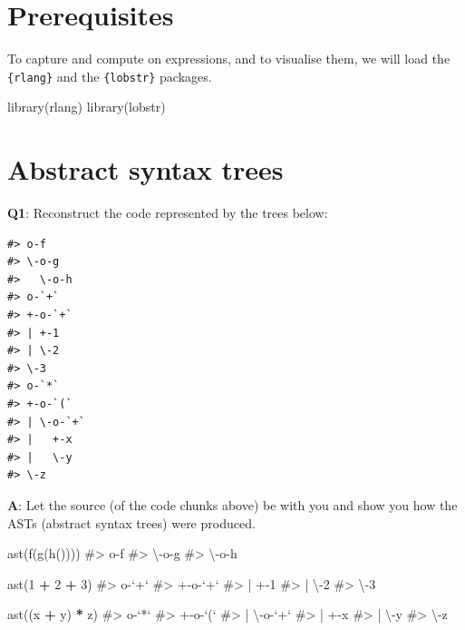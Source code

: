 \documentclass[
]{krantz}
\makeatletter
\newenvironment{Shaded}{\begin{snugshade}}{\end{snugshade}}
\newcommand{\CommentTok}[1]{\textcolor[rgb]{0.56,0.35,0.01}{\textit{#1}}}
\newcommand{\DecValTok}[1]{\textcolor[rgb]{0.00,0.00,0.81}{#1}}
\newcommand{\KeywordTok}[1]{\textcolor[rgb]{0.13,0.29,0.53}{\textbf{#1}}}
\newcommand{\NormalTok}[1]{#1}
\newcommand{\OperatorTok}[1]{\textcolor[rgb]{0.81,0.36,0.00}{\textbf{#1}}}
\newcommand{\StringTok}[1]{\textcolor[rgb]{0.31,0.60,0.02}{#1}}
\newenvironment{kframe}{%
\medskip{}
\setlength{\fboxsep}{.8em}
 \def\at@end@of@kframe{}%
 \ifinner\ifhmode%
  \def\at@end@of@kframe{\end{minipage}}%
  \begin{minipage}{\columnwidth}%
 \fi\fi%
 \def\FrameCommand##1{\hskip\@totalleftmargin \hskip-\fboxsep
 \colorbox{shadecolor}{##1}\hskip-\fboxsep
     \hskip-\linewidth \hskip-\@totalleftmargin \hskip\columnwidth}%
 \MakeFramed {\advance\hsize-\width
   \@totalleftmargin\z@ \linewidth\hsize
   \@setminipage}}%
 {\par\unskip\endMakeFramed%
 \at@end@of@kframe}
\renewenvironment{Shaded}{\begin{kframe}}{\end{kframe}}
\renewcommand{\KeywordTok} [1]{\textcolor[rgb]{0.00,0.44,0.13}{{#1}}}
\renewcommand{\DecValTok}  [1]{\textcolor[rgb]{0.25,0.63,0.44}{{#1}}}
\renewcommand{\StringTok}  [1]{\textcolor[rgb]{0.25,0.44,0.63}{{#1}}}
\renewcommand{\CommentTok} [1]{\textcolor[rgb]{0.38,0.63,0.69}{{#1}}}
\renewcommand{\NormalTok}  [1]{{#1}}
\makeatother
\begin{document}
\hypertarget{prerequisites-9}{%
\section*{Prerequisites}\label{prerequisites-9}}


To capture and compute on expressions, and to visualise them, we will load the \texttt{\{rlang\}} and the \texttt{\{lobstr\}} packages.

\begin{Shaded}
\begin{Highlighting}[]
\KeywordTok{library}\NormalTok{(rlang)}
\KeywordTok{library}\NormalTok{(lobstr)}
\end{Highlighting}
\end{Shaded}


\hypertarget{abstract-syntax-trees}{%
\section{Abstract syntax trees}\label{abstract-syntax-trees}}

\textbf{{Q1}}: Reconstruct the code represented by the trees below:

\begin{verbatim}
#> o-f 
#> \-o-g 
#>   \-o-h
#> o-`+` 
#> +-o-`+` 
#> | +-1 
#> | \-2 
#> \-3
#> o-`*` 
#> +-o-`(` 
#> | \-o-`+` 
#> |   +-x 
#> |   \-y 
#> \-z
\end{verbatim}

\textbf{{A}}: Let the source (of the code chunks above) be with you and show you how the ASTs (abstract syntax trees) were produced.

\begin{Shaded}
\begin{Highlighting}[]
\KeywordTok{ast}\NormalTok{(}\KeywordTok{f}\NormalTok{(}\KeywordTok{g}\NormalTok{(}\KeywordTok{h}\NormalTok{())))}
\CommentTok{#> o-f }
\CommentTok{#> \textbackslash{}-o-g }
\CommentTok{#>   \textbackslash{}-o-h}

\KeywordTok{ast}\NormalTok{(}\DecValTok{1} \OperatorTok{+}\StringTok{ }\DecValTok{2} \OperatorTok{+}\StringTok{ }\DecValTok{3}\NormalTok{)}
\CommentTok{#> o-`+` }
\CommentTok{#> +-o-`+` }
\CommentTok{#> | +-1 }
\CommentTok{#> | \textbackslash{}-2 }
\CommentTok{#> \textbackslash{}-3}

\KeywordTok{ast}\NormalTok{((x }\OperatorTok{+}\StringTok{ }\NormalTok{y) }\OperatorTok{*}\StringTok{ }\NormalTok{z)}
\CommentTok{#> o-`*` }
\CommentTok{#> +-o-`(` }
\CommentTok{#> | \textbackslash{}-o-`+` }
\CommentTok{#> |   +-x }
\CommentTok{#> |   \textbackslash{}-y }
\CommentTok{#> \textbackslash{}-z}
\end{Highlighting}
\end{Shaded}
\end{document}
